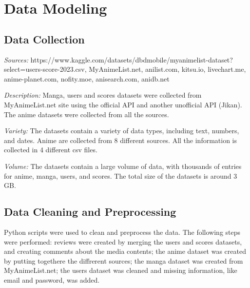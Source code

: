 \newpage


\section{Data Modeling}
\subsection{Data Collection}
\textit{Sources:} https://www.kaggle.com/datasets/dbdmobile/myanimelist-dataset?select=users-score-2023.csv, MyAnimeList.net,	anilist.com,  kitsu.io,			  livechart.me,
anime-planet.com,		nofity.moe,	   anisearch.com,		  anidb.net 	

\textit{Description:} Manga, users and scores datasets were collected from MyAnimeList.net site using the official API and another unofficial API (Jikan). The anime datasets were collected from all the sources. 

\textit{Variety:} The datasets contain a variety of data types, including text, numbers, and dates. Anime are collected from 8 different sources. All the information is collected in 4 different csv files.

\textit{Volume:} The datasets contain a large volume of data, with thousands of entries for anime, manga, users, and scores. The total size of the datasets is around 3 GB.

\subsection{Data Cleaning and Preprocessing}
Python scripts were used to clean and preprocess the data. The following steps were performed:
reviews were created by merging the users and scores datasets, and creating comments about the media contents;
the anime dataset was created by putting togethere the diffrerent sources;
the manga dataset was created from MyAnimeList.net;
the users dataset was cleaned and missing information, like email and password, was added.

